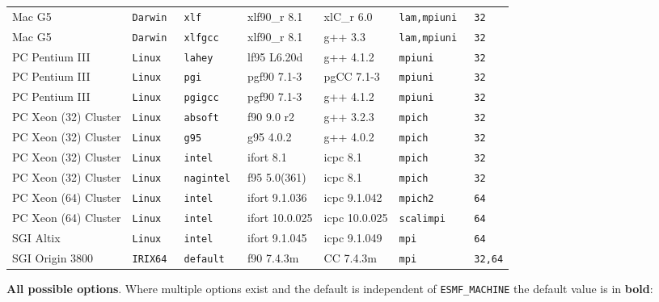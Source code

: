 \begin{tabular}{lllllll}
Mac G5          &\tt Darwin &\tt xlf     & xlf90\_r \footnotesize 8.1& xlC\_r \footnotesize 6.0 &\tt lam,mpiuni &\tt 32 \\
Mac G5          &\tt Darwin &\tt xlfgcc  & xlf90\_r \footnotesize 8.1& g++ \footnotesize 3.3    &\tt lam,mpiuni &\tt 32 \\
PC Pentium III  &\tt Linux  &\tt lahey   & lf95 \footnotesize L6.20d & g++ \footnotesize 4.1.2  &\tt mpiuni     &\tt 32 \\
PC Pentium III  &\tt Linux  &\tt pgi & pgf90 \footnotesize 7.1-3 & pgCC \footnotesize 7.1-3  &\tt mpiuni     &\tt 32 \\
PC Pentium III  &\tt Linux  &\tt pgigcc  & pgf90 \footnotesize 7.1-3 & g++ \footnotesize 4.1.2  &\tt mpiuni     &\tt 32 \\
PC Xeon (32) Cluster &\tt Linux  &\tt absoft & f90 \footnotesize 9.0 r2 & g++ \footnotesize 3.2.3 &\tt mpich      &\tt 32 \\
PC Xeon (32) Cluster &\tt Linux  &\tt g95     & g95 \footnotesize 4.0.2   & g++ \footnotesize 4.0.2  &\tt mpich      &\tt 32 \\
PC Xeon (32) Cluster &\tt Linux  &\tt intel   & ifort \footnotesize 8.1   & icpc \footnotesize 8.1   &\tt mpich      &\tt 32 \\
PC Xeon (32) Cluster &\tt Linux  &\tt nagintel & f95 \footnotesize 5.0(361) & icpc \footnotesize 8.1 &\tt mpich      &\tt 32 \\
PC Xeon (64) Cluster &\tt Linux  &\tt intel   & ifort \footnotesize 9.1.036   & icpc \footnotesize 9.1.042  &\tt mpich2      &\tt 64 \\
PC Xeon (64) Cluster &\tt Linux  &\tt intel   & ifort \footnotesize 10.0.025  & icpc \footnotesize 10.0.025 &\tt scalimpi    &\tt 64 \\
SGI Altix       &\tt Linux  &\tt intel   & ifort \footnotesize 9.1.045 & icpc \footnotesize 9.1.049 &\tt mpi    &\tt 64 \\
SGI Origin 3800 &\tt IRIX64 &\tt default & f90 \footnotesize 7.4.3m  & CC \footnotesize 7.4.3m  &\tt mpi        &\tt 32,64
\end{tabular}

\vspace{1ex}

{\bf All possible options}. Where multiple options exist 
and the default is independent of {\tt ESMF\_MACHINE} the default value is in {\bf bold}:

\vspace{1ex}


